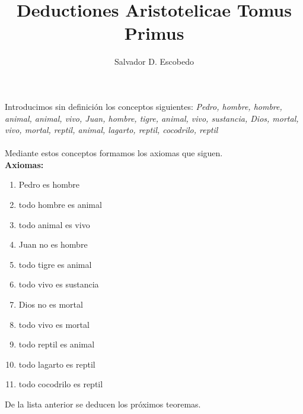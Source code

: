 ﻿\documentclass[12pt]{book}
\title{Deductiones Aristotelicae Tomus Primus}
\author{Salvador D. Escobedo}
\date{}
\begin{document}
\maketitle
 Introducimos sin definición los conceptos siguientes: \textit{
Pedro, hombre, hombre, animal, animal, vivo, Juan, hombre, tigre, animal, vivo, sustancia, Dios, mortal, vivo, mortal, reptil, animal, lagarto, reptil, cocodrilo, reptil}
\\
\\Mediante estos conceptos formamos los axiomas que siguen. \\
\textbf{Axiomas:}
\begin{enumerate}
\item Pedro es hombre
\item todo hombre es animal
\item todo animal es vivo
\item Juan no es hombre
\item todo tigre es animal
\item todo vivo es sustancia
\item Dios no es mortal
\item todo vivo es mortal
\item todo reptil es animal
\item todo lagarto es reptil
\item todo cocodrilo es reptil
\end{enumerate}De la lista anterior se deducen los próximos teoremas. \\
\end{document}
